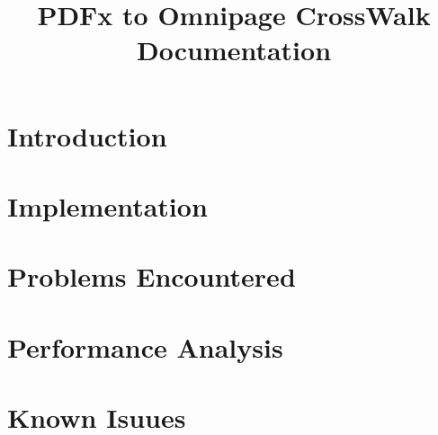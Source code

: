 \documentclass[12pt]{scrreprt}
\title{PDFx to Omnipage CrossWalk Documentation}
\date{}
\begin{document}
\maketitle

\tableofcontents

\chapter{Introduction}
\label{section:introduction}


\chapter{Implementation}
\label{section: method}


\chapter{Problems Encountered}
\label{section:experiments}
%

\chapter{Performance Analysis}
\label{section:discussion}
%

\chapter{Known Isuues}
\label{section:conclusion}
%
\end{document}
